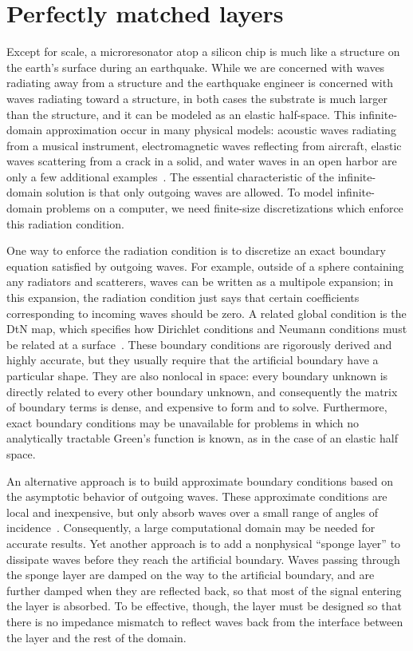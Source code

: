 \documentclass{article}
\begin{document}
\section{Perfectly matched layers}
\label{pml-section}

Except for scale, a microresonator atop a silicon chip is much like a
structure on the earth's surface during an earthquake.  While we are
concerned with waves radiating away from a structure and the
earthquake engineer is concerned with waves radiating toward a
structure, in both cases the substrate is much larger than the
structure, and it can be modeled as an elastic half-space.  This
infinite-domain approximation occur in many physical models: acoustic
waves radiating from a musical instrument, electromagnetic waves
reflecting from aircraft, elastic waves scattering from a crack in a
solid, and water waves in an open harbor are only a few additional
examples~\cite{Turkel:1998:ISI,Zienkiewicz:2000:FEMc}.  The essential
characteristic of the infinite-domain solution is that only outgoing
waves are allowed.  To model infinite-domain problems on a computer,
we need finite-size discretizations which enforce this radiation
condition.

One way to enforce the radiation condition is to discretize an exact
boundary equation satisfied by outgoing waves.  For example, outside
of a sphere containing any radiators and scatterers, waves can be
written as a multipole expansion; in this expansion, the radiation
condition just says that certain coefficients corresponding to
incoming waves should be zero.  A related global condition is the DtN
map, which specifies how Dirichlet conditions and Neumann conditions
must be related at a surface~\cite{Turkel:1998:ISI}.  These boundary
conditions are rigorously derived and highly accurate, but they
usually require that the artificial boundary have a particular shape.
They are also nonlocal in space: every boundary unknown is directly
related to every other boundary unknown, and consequently the matrix
of boundary terms is dense, and expensive to form and to solve.
Furthermore, exact boundary conditions may be unavailable for problems
in which no analytically tractable Green's function is known, as in
the case of an elastic half space.

An alternative approach is to build approximate boundary conditions
based on the asymptotic behavior of outgoing waves.  These approximate
conditions are local and inexpensive, but only absorb waves over a
small range of angles of
incidence~\cite{Turkel:1998:ISI,Basu:2003:PML}.  Consequently, a large
computational domain may be needed for accurate results.  Yet another
approach is to add a nonphysical ``sponge layer'' to dissipate waves
before they reach the artificial boundary.  Waves passing through the
sponge layer are damped on the way to the artificial boundary, and are
further damped when they are reflected back, so that most of the
signal entering the layer is absorbed.  To be effective, though, the
layer must be designed so that there is no impedance mismatch to
reflect waves back from the interface between the layer and the rest
of the domain.
\end{document}

